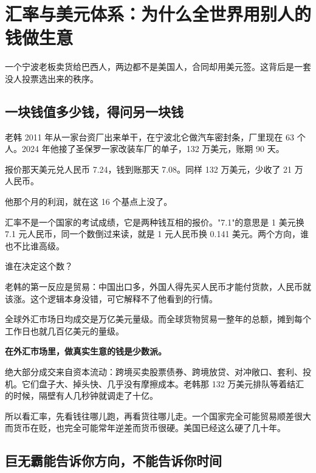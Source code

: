 \chapter{汇率与美元体系：为什么全世界用别人的钱做生意}

\begin{ledetext}
一个宁波老板卖货给巴西人，两边都不是美国人，合同却用美元签。这背后是一套没人投票选出来的秩序。
\end{ledetext}

\section{一块钱值多少钱，得问另一块钱}

老韩 2011 年从一家台资厂出来单干，在宁波北仑做汽车密封条，厂里现在 63 个人。2024 年他接了圣保罗一家改装车厂的单子，132 万美元，账期 90 天。

报价那天美元兑人民币 7.24，钱到账那天 7.08。同样 132 万美元，少收了 21 万人民币。

他那个月的利润，就在这 16 个基点上没了。

汇率不是一个国家的考试成绩，它是两种钱互相的报价。"7.1"的意思是 1 美元换 7.1 元人民币，同一个数倒过来读，就是 1 元人民币换 0.141 美元。两个方向，谁也不比谁高级。

谁在决定这个数？

老韩的第一反应是贸易：中国出口多，外国人得先买人民币才能付货款，人民币就该涨。这个逻辑本身没错，可它解释不了他看到的行情。

全球外汇市场日均成交是万亿美元量级。而全球货物贸易一整年的总额，摊到每个工作日也就几百亿美元的量级。

\textbf{在外汇市场里，做真实生意的钱是少数派。}

绝大部分成交来自资本流动：跨境买卖股票债券、跨境放贷、对冲敞口、套利、投机。它们盘子大、掉头快、几乎没有摩擦成本。老韩那 132 万美元排队等着结汇的时候，隔壁有人几秒钟就调走了十亿。

所以看汇率，先看钱往哪儿跑，再看货往哪儿走。一个国家完全可能贸易顺差很大而货币在贬，也完全可能常年逆差而货币很硬。美国已经这么硬了几十年。

\begin{chainflow}
\chainarrow {}\chainarrow {}\chainarrow {}\chainarrow {}\chainarrow {}
\end{chainflow}

\section{巨无霸能告诉你方向，不能告诉你时间}

